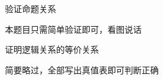 






\begin{exercise}[T1]
  验证命题关系
\end{exercise}

\begin{solution}
  本题目只需简单验证即可，看图说话
\end{solution}

\begin{exercise}[T2]
\label{ex:b1-c1-s1-q2}
证明逻辑关系的等价关系
\end{exercise}

\begin{solution}
简要略过，全部写出真值表即可判断正确

\end{solution}

